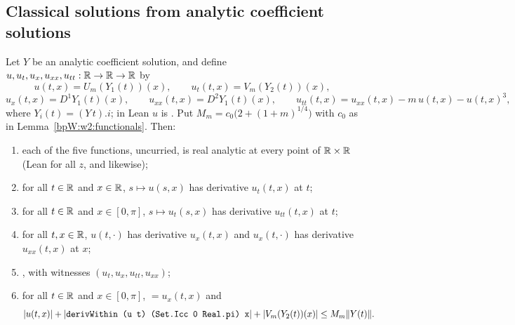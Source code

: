 \subsection{Classical solutions from analytic coefficient solutions}\label{bpW:w2:curve-sec}

\begin{theorem}\label{bpW:w2:curve}
Let $Y$ be an analytic coefficient solution, and define $u,u_t,u_x,u_{xx},u_{tt}:\mathbb{R}\to\mathbb{R}\to\mathbb{R}$ by
\[u(t,x)=U_m(Y_1(t))(x),\qquad u_t(t,x)=V_m(Y_2(t))(x),\]
\[u_x(t,x)=D^1Y_1(t)(x),\qquad u_{xx}(t,x)=D^2Y_1(t)(x),\qquad u_{tt}(t,x)=u_{xx}(t,x)-m\,u(t,x)-u(t,x)^3,\]
where $Y_i(t)=(Y\,t).i$; in Lean $u$ is . Put
$M_m=c_0\bigl(2+(1+m)^{1/4}\bigr)$ with $c_0$ as in Lemma~\ref{bpW:w2:functionals}. Then:
\begin{enumerate}[label=(\roman*)]
\item each of the five functions, uncurried, is real analytic at every point of $\mathbb{R}\times\mathbb{R}$ (Lean
   for all $z$, and likewise);
\item for all $t\in\mathbb{R}$ and $x\in\mathbb{R}$, $s\mapsto u(s,x)$ has derivative $u_t(t,x)$ at $t$;
\item for all $t\in\mathbb{R}$ and $x\in[0,\pi]$, $s\mapsto u_t(s,x)$ has derivative $u_{tt}(t,x)$ at $t$;
\item for all $t,x\in\mathbb{R}$, $u(t,\cdot)$ has derivative $u_x(t,x)$ and $u_x(t,\cdot)$ has derivative $u_{xx}(t,x)$ at $x$;
\item {}, with witnesses $(u_t,u_x,u_{tt},u_{xx})$;
\item for all $t\in\mathbb{R}$ and $x\in[0,\pi]$,  $=u_x(t,x)$ and
  \[\lvert u(t,x)\rvert+\lvert \texttt{derivWithin (u t) (Set.Icc 0 Real.pi) x}\rvert+\lvert V_m(Y_2(t))(x)\rvert\le M_m\lVert Y(t)\rVert.\]
\end{enumerate}
\end{theorem}


